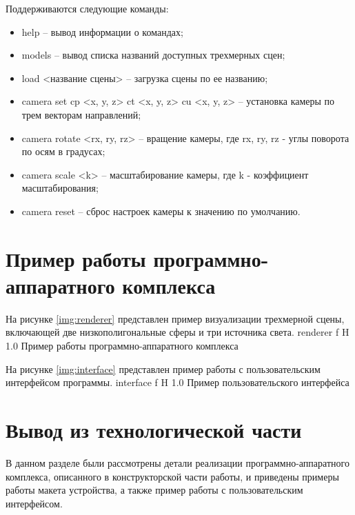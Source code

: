 Поддерживаются следующие команды:
\begin{itemize}
    \item help -- вывод информации о командах;
    \item models -- вывод списка названий доступных трехмерных сцен;
    \item load <название сцены> -- загрузка сцены по ее названию;
    \item camera set cp <x, y, z> ct <x, y, z> cu <x, y, z> -- установка камеры по трем векторам направлений;
    \item camera rotate <rx, ry, rz> -- вращение камеры, где rx, ry, rz - углы поворота по осям в градусах;
    \item camera scale <k> -- масштабирование камеры, где k - коэффициент масштабирования;
    \item camera reset -- сброс настроек камеры к значению по умолчанию.
\end{itemize}

\section{Пример работы программно-аппаратного комплекса}
На рисунке \ref{img:renderer} представлен пример визуализации трехмерной сцены, включающей две низкополигональные сферы и три источника света.
    {renderer}
    {f}
    {H}
    {1.0\textwidth}
    {Пример работы программно-аппаратного комплекса}

На рисунке \ref{img:interface} представлен пример работы с пользовательским интерфейсом программы.
    {interface}
    {f}
    {H}
    {1.0\textwidth}
    {Пример пользовательского интерфейса}

\section{Вывод из технологической части}
В данном разделе были рассмотрены детали реализации программно-аппаратного комплекса, описанного в конструкторской части работы, и приведены примеры работы макета устройства, а также пример работы с пользовательским интерфейсом.
